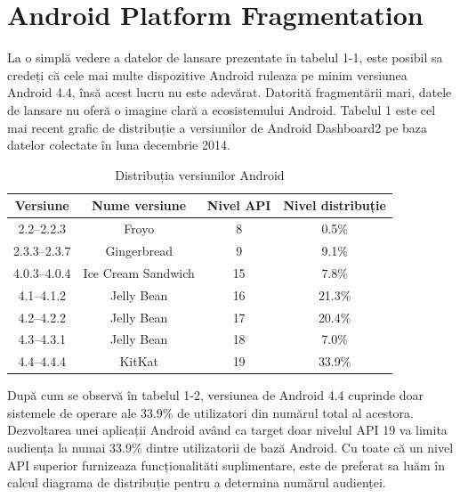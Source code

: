 \section{Android Platform Fragmentation}
La o simplă vedere a datelor de lansare prezentate in tabelul 1-1, este posibil sa credeți că cele mai multe dispozitive Android ruleaza pe minim versiunea Android 4.4, însă acest lucru nu este adevărat. \newline 
Datorită fragmentării mari, datele de lansare nu oferă o imagine clară a ecosistemului Android.\newline 
Tabelul 1 este cel mai recent grafic de distribuție a versiunilor de Android Dashboard2 \cite{2} pe baza datelor colectate în luna decembrie 2014.\cite{1}\newline 


\begin{table}[!hp]
\caption{Distribuția versiunilor Android}
\begin{tabular}{|c|c|c|c|}
\hline
\cellcolor{LightPink}Versiune & \cellcolor{LightGreen} Nume versiune & \cellcolor{LightPink} Nivel API &\cellcolor{LightGreen} Nivel distribuție\\
\hline
2.2–2.2.3& Froyo& 8& 0.5\%\\
\hline
2.3.3–2.3.7& Gingerbread& 9& 9.1\%\\
\hline
4.0.3–4.0.4& Ice Cream Sandwich& 15& 7.8\%\\
\hline
4.1–4.1.2& Jelly Bean& 16& 21.3\%\\
\hline
4.2–4.2.2& Jelly Bean& 17& 20.4\%\\
\hline
4.3–4.3.1& Jelly Bean& 18& 7.0\%\\
\hline
4.4–4.4.4& KitKat& 19& 33.9\%\\
\hline
\end{tabular}
\end{table}


După cum se observă în tabelul 1-2, versiunea de Android 4.4 cuprinde doar sistemele de operare ale 33.9\% de utilizatori din numărul total al acestora. Dezvoltarea unei aplicații Android având ca target doar nivelul API 19 va limita audiența la numai 33.9\% dintre utilizatorii de bază Android.
\newline Cu toate că un nivel API superior furnizeaza funcționalităti suplimentare, este de preferat sa luăm în calcul diagrama de distribuție pentru a determina numărul audienței.\cite{1}

